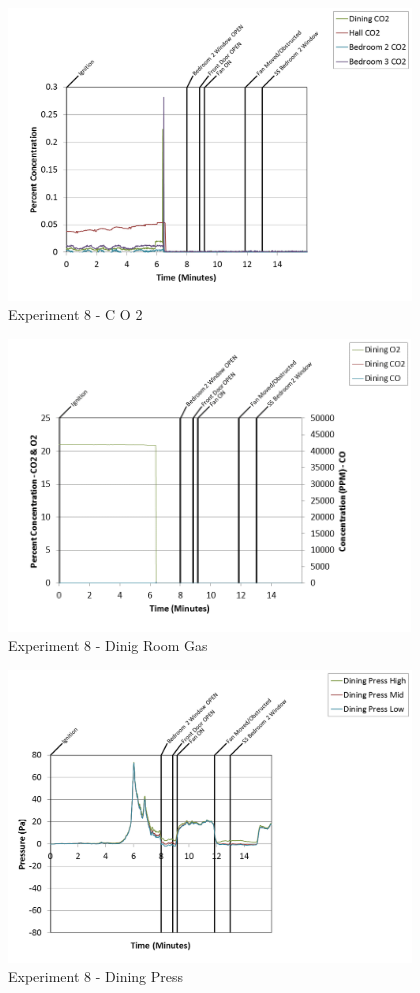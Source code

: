 \documentclass{article}
\begin{document}
\begin{appendices}
\clearpage

\begin{figure}[h!]
	\centering
	\includegraphics[height=3.05in]{0_Images/Results_Charts/Exp_8_Charts/CO2.png}
	\caption{Experiment 8 - C O 2}
\end{figure}


\begin{figure}[h!]
	\centering
	\includegraphics[height=3.05in]{0_Images/Results_Charts/Exp_8_Charts/DinigRoomGas.png}
	\caption{Experiment 8 - Dinig Room Gas}
\end{figure}

\clearpage

\begin{figure}[h!]
	\centering
	\includegraphics[height=3.05in]{0_Images/Results_Charts/Exp_8_Charts/DiningPress.png}
	\caption{Experiment 8 - Dining Press}
\end{figure}



\end{appendices}
\end{document}
